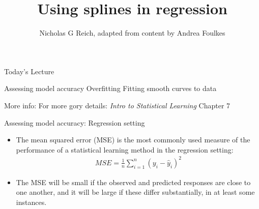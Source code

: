 \documentclass[table]{beamer}\usepackage[]{graphicx}\usepackage[]{color}
\title{Using splines in regression}
\author{Nicholas G Reich, adapted from content by Andrea Foulkes}
\begin{document}
\begin{frame}[plain]
        \titlepage
\end{frame}





\begin{frame}{Today's Lecture}

\bi
    \myitem Assessing model accuracy
    \myitem Overfitting
    \myitem Fitting smooth curves to data
\ei

\vspace{2em}

More info: 
\bi
    \myitem For more gory details: {\em Intro to Statistical Learning} Chapter 7
\ei


\end{frame}


\begin{frame}{Assessing model accuracy: Regression setting}
\begin{itemize}
\item The {\color{orange} mean squared error (MSE)} is the most commonly used measure of the performance of a statistical learning method in the regression setting:
%
\begin{eqnarray*}
MSE = \frac{1}{n} \sum_{i=1}^n \left(y_i -\hat y_i\right)^2
\end{eqnarray*}

\bigskip
\item The MSE will be small if the observed and predicted responses are close to one another, and it will be large if these differ substantially, in at least some instances.
\end{itemize}
\end{frame}


\end{document}
